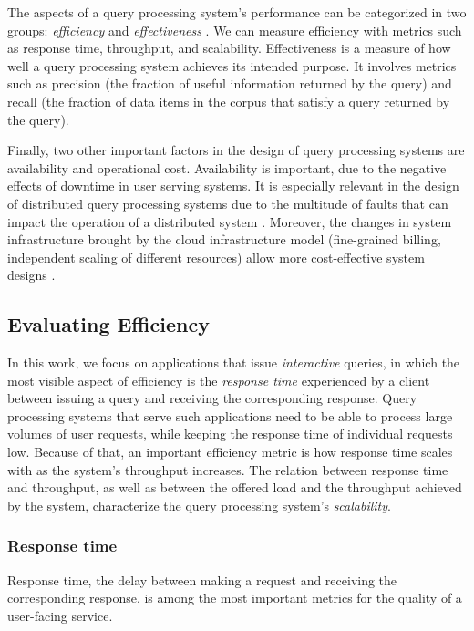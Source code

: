 
The aspects of a query processing system's performance can be categorized in two groups:
\textit{efficiency} and \textit{effectiveness} \cite{buttcher:informationretrieval}.
We can measure efficiency with metrics such as response time, throughput, and scalability.
Effectiveness is a measure of how well a query processing system achieves its intended purpose.
It involves metrics such as precision (the fraction of useful information returned by the query) and recall
(the fraction of data items in the corpus that satisfy a query returned by the query).

Finally, two other important factors in the design of query processing systems are availability and operational cost.
Availability is important, due to the negative effects of downtime in user serving systems.
It is especially relevant in the design of distributed query processing systems due to the multitude of faults that can
impact the operation of a distributed system \cite{kleppmann:designing}.
Moreover, the changes in system infrastructure brought by the cloud infrastructure model
(fine-grained billing, independent scaling of different resources) allow more cost-effective system designs \cite{vuppalapati:elasticqueryengine}.

\subsection{Evaluating Efficiency}

In this work, we focus on applications that issue \textit{interactive} queries,
in which the most visible aspect of efficiency is the \textit{response time} experienced by a client between issuing
a query and receiving the corresponding response.
Query processing systems that serve such applications need to be able to process large volumes of user requests,
while keeping the response time of individual requests low.
Because of that, an important efficiency metric is how response time scales with as the system's throughput increases.
The relation between response time and throughput, as well as between the offered load and the throughput achieved by the system,
characterize the query processing system's \textit{scalability}.

\subsubsection{Response time}
Response time, the delay between making a request and receiving the corresponding response,
is among the most important metrics for the quality of a user-facing service.

